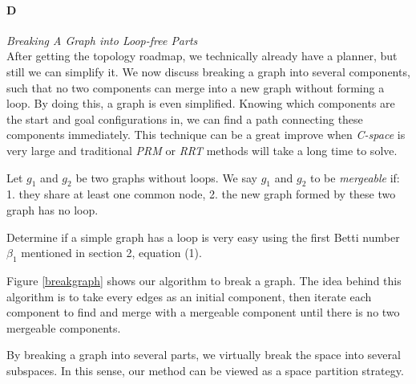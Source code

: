\documentclass[11pt]{article}
\begin{document}
\paragraph{D} \emph{Breaking A Graph into Loop-free Parts} \hfill\\
\indent After getting the topology roadmap, we technically already have a planner, but still we can simplify it. We now discuss breaking a graph into several components, such that no two components can merge into a new graph without forming a loop. By doing this, a graph is even simplified. Knowing which components are the start and goal configurations in, we can find a path connecting these components immediately. This technique can be a great improve when \emph{C-space} is very large and traditional \emph{PRM} or \emph{RRT} methods will take a long time to solve.

\indent Let $g_1$ and $g_2$ be two graphs without loops. We say $g_1$ and $g_2$ to be \emph{mergeable} if: 1. they share at least one common node, 2. the new graph formed by these two graph has no loop. 

\indent Determine if a simple graph has a loop is very easy using the first Betti number $\beta_1$ mentioned in section 2, equation (1). 

\indent Figure \ref{breakgraph} shows our algorithm to break a graph. The idea behind this algorithm is to take every edges as an initial component, then iterate each component to find and merge with a mergeable component until there is no two mergeable components.

\indent By breaking a graph into several parts, we virtually break the space into several subspaces. In this sense, our method can be viewed as a space partition strategy.
\end{document}
